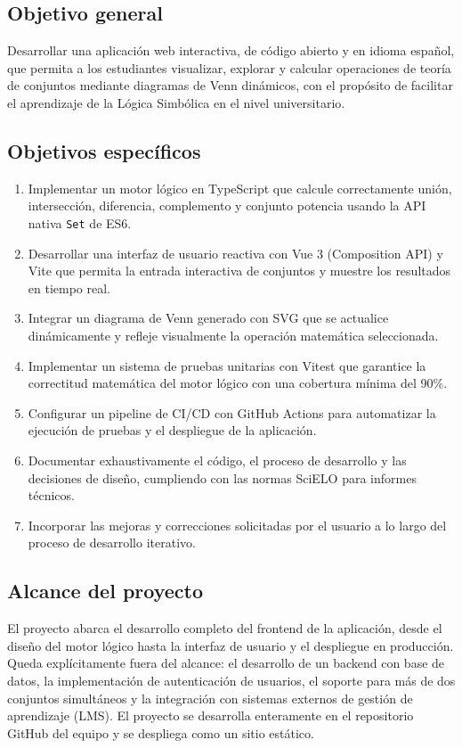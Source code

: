 \documentclass[11pt,a4paper]{article}
\begin{document}
\subsection{Objetivo general}
Desarrollar una aplicación web interactiva, de código abierto y en idioma español, que permita a los estudiantes visualizar, explorar y calcular operaciones de teoría de conjuntos mediante diagramas de Venn dinámicos, con el propósito de facilitar el aprendizaje de la Lógica Simbólica en el nivel universitario.

\subsection{Objetivos específicos}
\begin{enumerate}[label=\arabic*.]
    \item Implementar un motor lógico en TypeScript que calcule correctamente unión, intersección, diferencia, complemento y conjunto potencia usando la API nativa \texttt{Set} de ES6.
    \item Desarrollar una interfaz de usuario reactiva con Vue 3 (Composition API) y Vite que permita la entrada interactiva de conjuntos y muestre los resultados en tiempo real.
    \item Integrar un diagrama de Venn generado con SVG que se actualice dinámicamente y refleje visualmente la operación matemática seleccionada.
    \item Implementar un sistema de pruebas unitarias con Vitest que garantice la correctitud matemática del motor lógico con una cobertura mínima del 90\%.
    \item Configurar un pipeline de CI/CD con GitHub Actions para automatizar la ejecución de pruebas y el despliegue de la aplicación.
    \item Documentar exhaustivamente el código, el proceso de desarrollo y las decisiones de diseño, cumpliendo con las normas SciELO para informes técnicos.
    \item Incorporar las mejoras y correcciones solicitadas por el usuario a lo largo del proceso de desarrollo iterativo.
\end{enumerate}

\subsection{Alcance del proyecto}
El proyecto abarca el desarrollo completo del frontend de la aplicación, desde el diseño del motor lógico hasta la interfaz de usuario y el despliegue en producción. Queda explícitamente fuera del alcance: el desarrollo de un backend con base de datos, la implementación de autenticación de usuarios, el soporte para más de dos conjuntos simultáneos y la integración con sistemas externos de gestión de aprendizaje (LMS). El proyecto se desarrolla enteramente en el repositorio GitHub del equipo y se despliega como un sitio estático.
\end{document}
